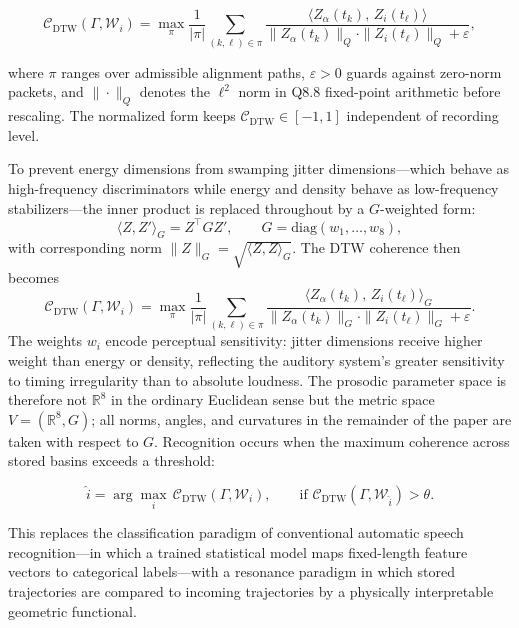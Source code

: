 \documentclass[12pt, a4paper]{article}
\begin{document}
\begin{equation}
\mathcal{C}_{\mathrm{DTW}}(\Gamma, \mathcal{W}_i)
=
\max_{\pi}
\frac{1}{|\pi|}
\sum_{(k, \ell) \in \pi}
\frac{\langle Z_\alpha(t_k),\, Z_i(t_\ell) \rangle}
{\|Z_\alpha(t_k)\|_{Q} \cdot \|Z_i(t_\ell)\|_{Q} + \varepsilon},
\label{eq:dtw}
\end{equation}

where $\pi$ ranges over admissible alignment paths, $\varepsilon > 0$ guards against zero-norm packets, and $\|\cdot\|_{Q}$ denotes the $\ell^2$ norm in Q8.8 fixed-point arithmetic before rescaling. The normalized form keeps $\mathcal{C}_{\mathrm{DTW}} \in [-1, 1]$ independent of recording level.

To prevent energy dimensions from swamping jitter dimensions---which behave as high-frequency discriminators while energy and density behave as low-frequency stabilizers---the inner product is replaced throughout by a $G$-weighted form:
\begin{equation}
\langle Z, Z' \rangle_G = Z^\top G Z', \qquad G = \mathrm{diag}(w_1, \ldots, w_8),
\label{eq:Gproduct}
\end{equation}
with corresponding norm $\|Z\|_G = \sqrt{\langle Z, Z \rangle_G}$. The DTW coherence then becomes
\begin{equation}
\mathcal{C}_{\mathrm{DTW}}(\Gamma, \mathcal{W}_i)
= \max_{\pi} \frac{1}{|\pi|} \sum_{(k,\ell) \in \pi}
\frac{\langle Z_\alpha(t_k),\, Z_i(t_\ell) \rangle_G}
{\|Z_\alpha(t_k)\|_G \cdot \|Z_i(t_\ell)\|_G + \varepsilon}.
\label{eq:dtwG}
\end{equation}
The weights $w_i$ encode perceptual sensitivity: jitter dimensions receive higher weight than energy or density, reflecting the auditory system's greater sensitivity to timing irregularity than to absolute loudness. The prosodic parameter space is therefore not $\mathbb{R}^8$ in the ordinary Euclidean sense but the metric space $V = (\mathbb{R}^8, G)$; all norms, angles, and curvatures in the remainder of the paper are taken with respect to $G$. Recognition occurs when the maximum coherence across stored basins exceeds a threshold:

\begin{equation}
\hat{i} = \arg\max_i\, \mathcal{C}_{\mathrm{DTW}}(\Gamma, \mathcal{W}_i), \qquad \text{if } \mathcal{C}_{\mathrm{DTW}}(\Gamma, \mathcal{W}_{\hat{i}}) > \theta.
\label{eq:recog}
\end{equation}

This replaces the classification paradigm of conventional automatic speech recognition---in which a trained statistical model maps fixed-length feature vectors to categorical labels---with a resonance paradigm in which stored trajectories are compared to incoming trajectories by a physically interpretable geometric functional.
\end{document}
